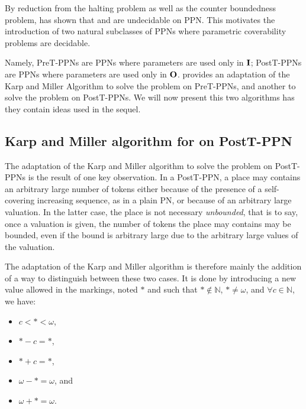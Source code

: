 \label{sec:preliminaries-ppn}

By reduction from the halting problem as well as the counter boundedness problem, \cite{David17} has shown that \Ucov and \Ecov are undecidable on \ac{PPN}.
This motivates the introduction of two natural subclasses of \acp{PPN} where parametric coverability problems are decidable.

Namely,
PreT-PPNs are \acp{PPN} where parameters are used only in $\mathbf{I}$;
PostT-PPNs are \acp{PPN} where parameters are used only in $\mathbf{O}$.
\cite{David17} provides an adaptation of the Karp and Miller Algorithm to solve the \Ucov problem on PreT-\acp{PPN}, and another to solve the \Ecov problem on PostT-\acp{PPN}.
We will now present this two algorithms has they contain ideas used in the sequel.

\subsection{Karp and Miller algorithm for \Ecov on PostT-\ac{PPN}}

The adaptation of the Karp and Miller algorithm to solve the \Ecov problem on PostT-\acp{PPN} is the result of one key observation.
In a PostT-\ac{PPN}, a place may contains an arbitrary large number of tokens either because of the presence of a self-covering increasing sequence, as in a plain \ac{PN}, or because of an arbitrary large valuation.
In the latter case, the place is not necessary \emph{unbounded}, that is to say, once a valuation is given, the number of tokens the place may contains may be bounded, even if the bound is arbitrary large due to the arbitrary large values of the valuation.

The adaptation of the Karp and Miller algorithm is therefore mainly the addition of a way to distinguish between these two cases.
It is done by introducing a new value allowed in the markings, noted $*$ and such that $* \notin \mathbb{N}$, $* \neq \omega$, and $\forall c \in \mathbb{N}$, we have:
\begin{itemize}
  \item $c < * < \omega$,
  \item $* - c = *$,
  \item $* + c = *$,
  \item $\omega - * = \omega$, and
  \item $\omega + * = \omega$.
\end{itemize}

